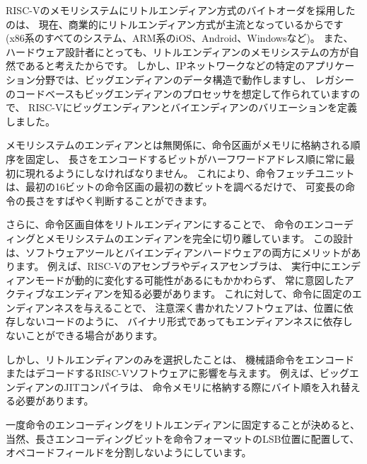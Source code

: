 \begin{commentary}
RISC-Vのメモリシステムにリトルエンディアン方式のバイトオーダを採用したのは、
現在、商業的にリトルエンディアン方式が主流となっているからです
(x86系のすべてのシステム、ARM系のiOS、Android、Windowsなど)。 
また、ハードウェア設計者にとっても、リトルエンディアンのメモリシステムの方が自然であると考えたからです。 
しかし、IPネットワークなどの特定のアプリケーション分野では、ビッグエンディアンのデータ構造で動作しますし、
レガシーのコードベースもビッグエンディアンのプロセッサを想定して作られていますので、
RISC-Vにビッグエンディアンとバイエンディアンのバリエーションを定義しました。

メモリシステムのエンディアンとは無関係に、命令区画がメモリに格納される順序を固定し、
長さをエンコードするビットがハーフワードアドレス順に常に最初に現れるようにしなければなりません。
これにより、命令フェッチユニットは、最初の16ビットの命令区画の最初の数ビットを調べるだけで、
可変長の命令の長さをすばやく判断することができます。

さらに、命令区画自体をリトルエンディアンにすることで、
命令のエンコーディングとメモリシステムのエンディアンを完全に切り離しています。
この設計は、ソフトウェアツールとバイエンディアンハードウェアの両方にメリットがあります。
例えば、RISC-Vのアセンブラやディスアセンブラは、
実行中にエンディアンモードが動的に変化する可能性があるにもかかわらず、
常に意図したアクティブなエンディアンを知る必要があります。
これに対して、命令に固定のエンディアンネスを与えることで、
注意深く書かれたソフトウェアは、位置に依存しないコードのように、
バイナリ形式であってもエンディアンネスに依存しないことができる場合があります。

しかし、リトルエンディアンのみを選択したことは、
機械語命令をエンコードまたはデコードするRISC-Vソフトウェアに影響を与えます。
例えば、ビッグエンディアンのJITコンパイラは、
命令メモリに格納する際にバイト順を入れ替える必要があります。

一度命令のエンコーディングをリトルエンディアンに固定することが決めると、
当然、長さエンコーディングビットを命令フォーマットのLSB位置に配置して、
オペコードフィールドを分割しないようにしています。
\end{commentary}

